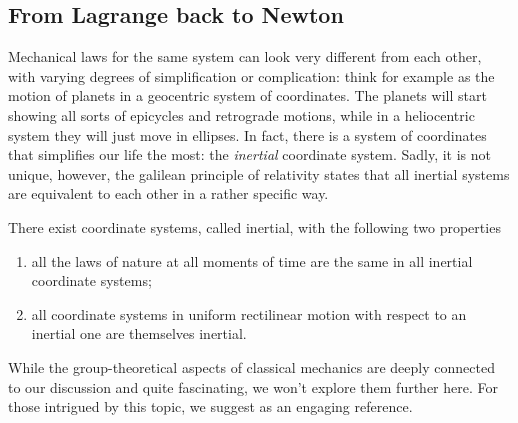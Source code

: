 \documentclass[english,fontsize=11pt,paper=b5]{scrbook}
\numberwithin{equation}{chapter}
\theoremstyle{definition}
\begin{document}
    \subsection{From Lagrange back to Newton}\label{sec:dynamicspps}

    Mechanical laws for the same system can look very different from each other, with varying degrees of simplification or complication: think for example as the motion of planets in a geocentric system of coordinates. The planets will start showing all sorts of epicycles and retrograde motions, while in a heliocentric system they will just move in ellipses.
    In fact, there is a system of coordinates that simplifies our life the most: the \emph{inertial} coordinate system.
    Sadly, it is not unique, however, the galilean principle of relativity states that all inertial systems are equivalent to each other in a rather specific way.

    \begin{tcolorbox}[title=Galilean principle of relativity]
      There exist coordinate systems, called inertial, with the following two properties
      \begin{enumerate}
        \item all the laws of nature at all moments of time are the same in all inertial coordinate systems;
        \item all coordinate systems in uniform rectilinear motion with respect to an inertial one are themselves inertial.
      \end{enumerate}
    \end{tcolorbox}

    While the group-theoretical aspects of classical mechanics are deeply connected to our discussion and quite fascinating, we won't explore them further here.
    For those intrigued by this topic, we suggest \cite{book:marsdenratiu} as an engaging reference.
\end{document}
